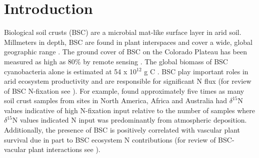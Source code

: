 \section{Introduction}


Biological soil crusts (BSC) are a microbial mat-like surface layer in arid soil. Millmeters in depth, BSC are found in plant interspaces and cover a wide, global geographic range \cite{garcia2003estimates}. The ground cover of BSC on the Colorado Plateau has been measured as high as 80\% by remote sensing \cite{karnieli2001}. The global biomass of BSC cyanobacteria alone is estimated at 54 x 10$^{12}$ g C \cite{garcia2003estimates}. BSC play important roles in arid ecosystem productivity and are responsible for significant N flux (for review of BSC N-fixation see \citet{belnap2003}). For example, \citet{Evans_1999} found approximately five times as many soil crust samples from sites in North America, Africa and Australia had $\delta^{15}$N values indicative of high N-fixation input relative to the number of samples where $\delta^{15}$N values indicated N input was predominantly from atmospheric deposition. Additionally, the presence of BSC is positively correlated with vascular plant survival due in part to BSC ecosystem N contributions (for review of BSC-vacular plant interactions see \citet{BelnapVascular}).

